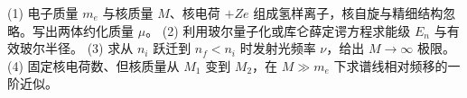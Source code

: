 (1) 电子质量 \(m_e\) 与核质量 \(M\)、核电荷 \(+Ze\) 组成氢样离子，核自旋与精细结构忽略。写出两体约化质量 \(\mu\)。
(2) 利用玻尔量子化或库仑薛定谔方程求能级 \(E_n\) 与有效玻尔半径。
(3) 求从 \(n_i\) 跃迁到 \(n_f<n_i\) 时发射光频率 \(\nu\)，给出 \(M\to\infty\) 极限。
(4) 固定核电荷数、但核质量从 \(M_1\) 变到 \(M_2\)，在 \(M\gg m_e\) 下求谱线相对频移的一阶近似。
